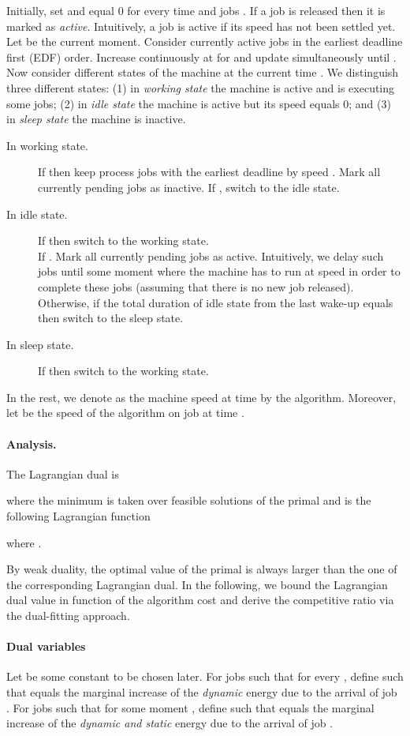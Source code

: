 \documentclass[11pt]{article}
\begin{document}
Initially, set  and  equal 0 for every time  and jobs .
If a job is released then it is marked as \emph{active}. Intuitively, a job is active 
if its speed  has not been settled yet. 
Let  be the current moment. Consider currently active jobs in the earliest deadline 
first (EDF) order. Increase continuously  at  for 
and update simultaneously  until .
Now consider different states of the machine at the current time . We distinguish 
three different states: (1) in \emph{working state} the machine is active and 
is executing some jobs; (2) in \emph{idle state} the machine is active but 
its speed equals 0; and (3) in \emph{sleep state} the machine is inactive.   
\begin{description}
	\item[In working state.] If  then keep 
	process jobs with the earliest deadline by speed . 
	Mark all currently pending jobs as inactive.
	If , switch to the idle state.
\item[In idle state.] If  then switch to the working state. \\
	If . Mark all currently pending jobs as active. 
	Intuitively, we delay such jobs until some moment where the machine has to run
	at speed  in order to complete these jobs (assuming that there is no new job released).\\
	Otherwise, if the total duration of idle state from the last wake-up equals  then switch 
	to the sleep state.
\item[In sleep state.] If  then switch to the working state.
\end{description}

In the rest, we denote  as the machine speed at time 
by the algorithm. Moreover, let  be the speed of the algorithm
on job  at time . 


\paragraph{Analysis.} The Lagrangian dual is
 
where the minimum is taken over   feasible solutions of the primal and 
 is the following Lagrangian function 

where . 

By weak duality, the optimal value of the primal is always larger than the one of the 
corresponding Lagrangian dual. In the following, we bound the Lagrangian dual value
in function of the algorithm cost and derive the competitive 
ratio via the dual-fitting approach.


\paragraph{Dual variables} Let  be 
some constant to be chosen later. For jobs  such that 
 for every ,
define  such that  equals the marginal 
increase of the \emph{dynamic} energy due to the arrival of job . For jobs  such that 
 for some moment ,
define  such that  equals the marginal 
increase of the \emph{dynamic and static} energy due to the arrival of job .
\end{document}
